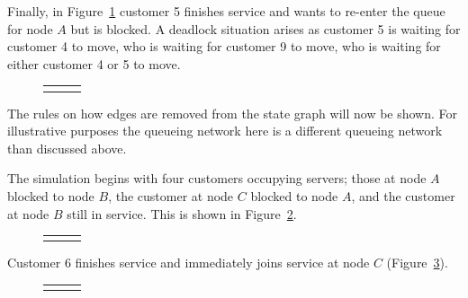 \documentclass{article}
\begin{document}
Finally, in Figure~\ref{fig:general_buildup_5} customer 5 finishes service and wants to re-enter the queue for node $A$ but is blocked.
A deadlock situation arises as customer 5 is waiting for customer 4 to move, who is waiting for customer 9 to move, who is waiting for either customer 4 or 5 to move.

\begin{figure}[H]
  \begin{tabular}{ c c c }
       & \hspace{0.1\textwidth} &
       \\
  \end{tabular}
  \caption{}
  \label{fig:general_buildup_5}
\end{figure}

The rules on how edges are removed from the state graph will now be shown.
For illustrative purposes the queueing network here is a different queueing network than discussed above.

The simulation begins with four customers occupying servers; those at node $A$ blocked to node $B$, the customer at node $C$ blocked to node $A$, and the customer at node $B$ still in service.
This is shown in Figure~\ref{fig:general_builddown_1}.

\begin{figure}[H]
  \begin{center}
    \begin{tabular}{ c c c }
       & \hspace{0.1\textwidth} &
       \\
  \end{tabular}
  \end{center}
  \caption{}
  \label{fig:general_builddown_1}
\end{figure}

Customer 6 finishes service and immediately joins service at node $C$ (Figure~\ref{fig:general_builddown_2}).

\begin{figure}[H]
  \begin{center}
    \begin{tabular}{ c c c }
       & \hspace{0.1\textwidth} &
       \\
  \end{tabular}
  \end{center}
  \caption{}
  \label{fig:general_builddown_2}
\end{figure}
\end{document}
